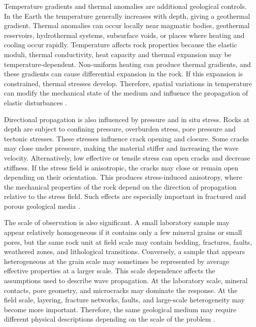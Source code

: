 Temperature gradients and thermal anomalies are additional geological controls. In the Earth the temperature generally increases with depth, giving a geothermal gradient. Thermal anomalies can occur locally near magmatic bodies, geothermal reservoirs, hydrothermal systems, subsurface voids, or places where heating and cooling occur rapidly. Temperature affects rock properties because the elastic moduli, thermal conductivity, heat capacity and thermal expansion may be temperature-dependent. Non-uniform heating can produce thermal gradients, and these gradients can cause differential expansion in the rock. If this expansion is constrained, thermal stresses develop. Therefore, spatial variations in temperature can modify the mechanical state of the medium and influence the propagation of elastic disturbances \cite{robertson1988,turcotte2014,jaeger2007}.

Directional propagation is also influenced by pressure and in situ stress. Rocks at depth are subject to confining pressure, overburden stress, pore pressure and tectonic stresses. These stresses influence crack opening and closure. Some cracks may close under pressure, making the material stiffer and increasing the wave velocity. Alternatively, low effective or tensile stress can open cracks and decrease stiffness. If the stress field is anisotropic, the cracks may close or remain open depending on their orientation. This produces stress-induced anisotropy, where the mechanical properties of the rock depend on the direction of propagation relative to the stress field. Such effects are especially important in fractured and porous geological media \cite{jaeger2007,crampin1981,mavko2009}.

The scale of observation is also significant. A small laboratory sample may appear relatively homogeneous if it contains only a few mineral grains or small pores, but the same rock unit at field scale may contain bedding, fractures, faults, weathered zones, and lithological transitions. Conversely, a sample that appears heterogeneous at the grain scale may sometimes be represented by average effective properties at a larger scale. This scale dependence affects the assumptions used to describe wave propagation. At the laboratory scale, mineral contacts, pore geometry, and microcracks may dominate the response. At the field scale, layering, fracture networks, faults, and large-scale heterogeneity may become more important. Therefore, the same geological medium may require different physical descriptions depending on the scale of the problem \cite{mavko2009,jaeger2007,wolff1982}.

